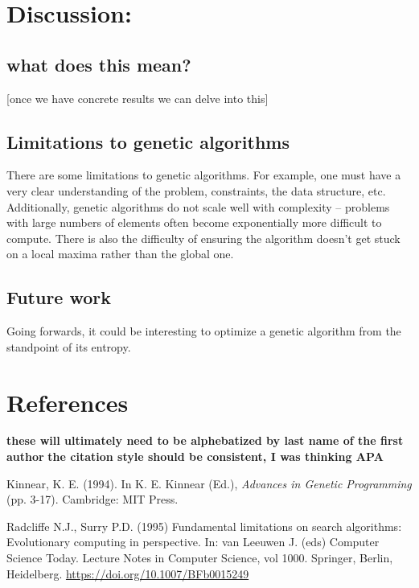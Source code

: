 \documentclass[11pt]{article}
\begin{document}
\section{Discussion:}
\label{sec:org7999995}
\subsection{what does this mean?}
\label{sec:orgf7b36ed}
[once we have concrete results we can delve into this]

\subsection{Limitations to genetic algorithms}
\label{sec:org148bf83}
There are some limitations to genetic algorithms. For example, one must have a very clear understanding of the problem, constraints, the data structure, etc. Additionally, genetic algorithms do not scale well with complexity -- problems with large numbers of elements often become exponentially more difficult to compute. There is also the difficulty of ensuring the algorithm doesn't get stuck on a local maxima rather than the global one.

\subsection{Future work}
\label{sec:org0f04af1}
Going forwards, it could be interesting to optimize a genetic algorithm from the standpoint of its entropy.

\section{References}
\label{sec:org9dc046e}
\textbf{these will ultimately need to be alphebatized by last name of the first author} \textbf{the citation style should be consistent, I was thinking APA}

Kinnear, K. E. (1994). In K. E. Kinnear (Ed.), \emph{Advances in Genetic Programming} (pp. 3-17). Cambridge: MIT Press.

Radcliffe N.J., Surry P.D. (1995) Fundamental limitations on search algorithms: Evolutionary computing in perspective.
In: van Leeuwen J. (eds) Computer Science Today. Lecture Notes in Computer Science, vol 1000. Springer, Berlin, Heidelberg.
\url{https://doi.org/10.1007/BFb0015249}
\end{document}
